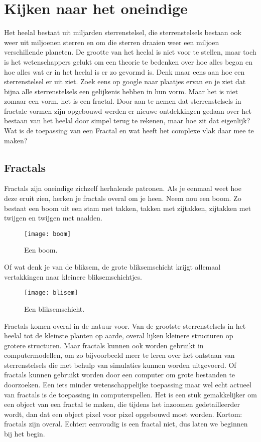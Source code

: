 \documentclass[11pt,fleqn]{book} %
\begin{document}
\chapter{Kijken naar het oneindige}
Het heelal bestaat uit miljarden sterrenstelsel, die sterrenstelsels bestaan ook weer uit miljoenen sterren en om die sterren draaien weer een miljoen verschillende planeten. De grootte van het heelal is niet voor te stellen, maar toch is het wetenschappers gelukt om een theorie te bedenken over hoe alles begon en hoe alles wat er in het heelal is er zo gevormd is. Denk maar eens aan hoe een sterrenstelsel er uit ziet. Zoek eens op google naar plaatjes ervan en je ziet dat bijna alle sterrenstelsels een gelijkenis hebben in hun vorm. Maar het is niet zomaar een vorm, het is een fractal. Door aan te nemen dat sterrenstelsels in fractale vormen zijn opgebouwd werden er nieuwe ontdekkingen gedaan over het bestaan van het heelal door simpel terug te rekenen, maar hoe zit dat eigenlijk? Wat is de toepassing van een Fractal en wat heeft het complexe vlak daar mee te maken?

\section{Fractals}
Fractals zijn oneindige zichzelf herhalende patronen. Als je eenmaal weet hoe deze eruit zien, herken je fractals overal om je heen. 
Neem nou een boom. Zo bestaat een boom uit een stam met takken, takken met zijtakken, zijtakken met twijgen en twijgen met naalden.
\begin{figure}[h]
	\centering\texttt{[image: boom]}
	\caption{Een boom.}
	\label{fig:boom}
\end{figure}
Of wat denk je van de bliksem, de grote bliksemschicht krijgt allemaal vertakkingen naar kleinere bliksemschichtjes.
\begin{figure}[h]
	\centering\texttt{[image: blisem]}
	\caption{Een bliksemschicht.}
	\label{fig:bliksem}
\end{figure}

Fractals komen overal in de natuur voor. Van de grootste sterrenstelsels in het heelal tot de kleinste planten op aarde, overal lijken kleinere structuren op grotere structuren. Maar fractals kunnen ook worden gebruikt in computermodellen, om zo bijvoorbeeld meer te leren over het ontstaan van sterrenstelsels die met behulp van simulaties kunnen worden uitgevoerd. Of fractals kunnen gebruikt worden door een computer om grote bestanden te doorzoeken. Een iets minder wetenschappelijke toepassing maar wel echt actueel van fractals is de toepassing in computerspellen. Het is een stuk gemakkelijker om een object van een fractal te maken, die tijdens het inzoomen gedetailleerder wordt, dan dat een object pixel voor pixel opgebouwd moet worden. Kortom: fractals zijn overal. Echter: eenvoudig is een fractal niet, dus laten we beginnen bij het begin.
\end{document}

